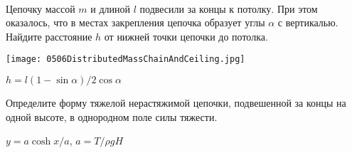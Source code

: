 \begin{ex}
\hspace{0pt} \\
\begin{minipage}{.65\textwidth}
Цепочку массой $m$ и длиной $l$ подвесили за концы к потолку. При этом оказалось, что в местах закрепления цепочка образует углы $\alpha $ с вертикалью. Найдите расстояние $h$ от нижней точки цепочки до потолка.
\end{minipage}
\begin{minipage}{.35\textwidth}
\centering
\texttt{[image: 0506DistributedMassChainAndCeiling.jpg]}
\end{minipage}
\begin{ans}
$h = l(1 - \sin \alpha)/2 \cos \alpha$
\end{ans}
\end{ex}

\begin{ex}
Определите форму тяжелой нерастяжимой цепочки, подвешенной за концы на одной высоте, в однородном поле силы тяжести.
\begin{ans}
$y = a \cosh x/a$, $a = T/\rho g H$
\end{ans}
\end{ex}
